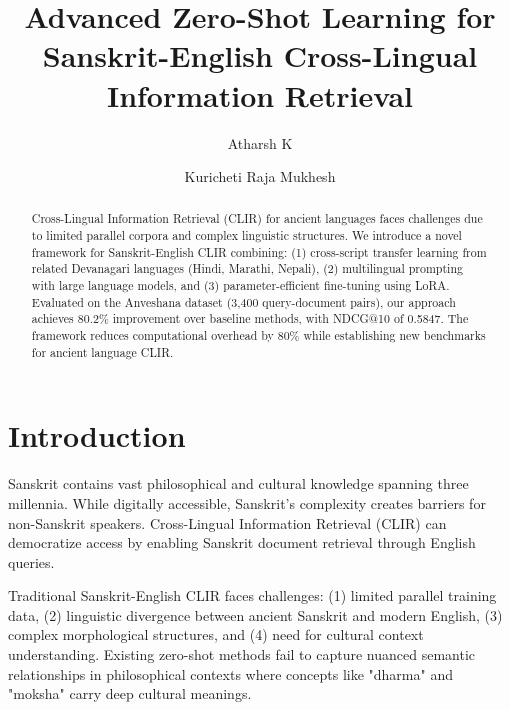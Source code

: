 \documentclass[runningheads]{llncs}
\begin{document}
\title{Advanced Zero-Shot Learning for Sanskrit-English Cross-Lingual Information Retrieval}


\author{Atharsh K \and
Kuricheti Raja Mukhesh}



\maketitle

\begin{abstract}
Cross-Lingual Information Retrieval (CLIR) for ancient languages faces challenges due to limited parallel corpora and complex linguistic structures. We introduce a novel framework for Sanskrit-English CLIR combining: (1) cross-script transfer learning from related Devanagari languages (Hindi, Marathi, Nepali), (2) multilingual prompting with large language models, and (3) parameter-efficient fine-tuning using LoRA. Evaluated on the Anveshana dataset (3,400 query-document pairs), our approach achieves 80.2\% improvement over baseline methods, with NDCG@10 of 0.5847. The framework reduces computational overhead by 80\% while establishing new benchmarks for ancient language CLIR.

\end{abstract}

\section{Introduction}

Sanskrit contains vast philosophical and cultural knowledge spanning three millennia. While digitally accessible, Sanskrit's complexity creates barriers for non-Sanskrit speakers. Cross-Lingual Information Retrieval (CLIR) can democratize access by enabling Sanskrit document retrieval through English queries.

Traditional Sanskrit-English CLIR faces challenges: (1) limited parallel training data, (2) linguistic divergence between ancient Sanskrit and modern English, (3) complex morphological structures, and (4) need for cultural context understanding. Existing zero-shot methods fail to capture nuanced semantic relationships in philosophical contexts where concepts like "dharma" and "moksha" carry deep cultural meanings.
\end{document}
